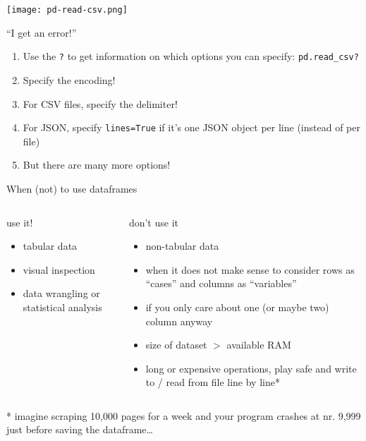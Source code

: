 \begin{frame}[plain]
	\texttt{[image: pd-read-csv.png]}
\end{frame}




\begin{frame}{``I get an error!''}

\begin{enumerate}
	\item Use the \texttt{?} to get information on which options you can specify: \texttt{pd.read\_csv?}
	\item Specify the encoding!
	\item For CSV files, specify the delimiter!
	\item For JSON, specify \texttt{lines=True} if it's one JSON object per line (instead of per file)
	\item But there are many more options!
\end{enumerate}

\end{frame}





\begin{frame}{When (not) to use dataframes}
	\footnotesize
	\begin{columns}[T]
		\begin{exampleblock}{use it!}
			\begin{itemize}
				\item tabular data
				\item visual inspection
				\item data wrangling or statistical analysis
			\end{itemize}
		\end{exampleblock}
		\begin{alertblock}{don't use it}
			\begin{itemize}
				\item non-tabular data
				\item when it does not make sense to consider rows as ``cases'' and columns as ``variables''
				\item if you only care about one (or maybe two) column anyway
				\item size of dataset $>$ available RAM 
				\item long or expensive operations, play safe and write to / read from file line by line*
			\end{itemize}
		\end{alertblock}
	\end{columns}
	
	\tiny{* imagine scraping 10,000 pages for a week and your program crashes at nr. 9,999 just before saving the dataframe\ldots}
\end{frame}





